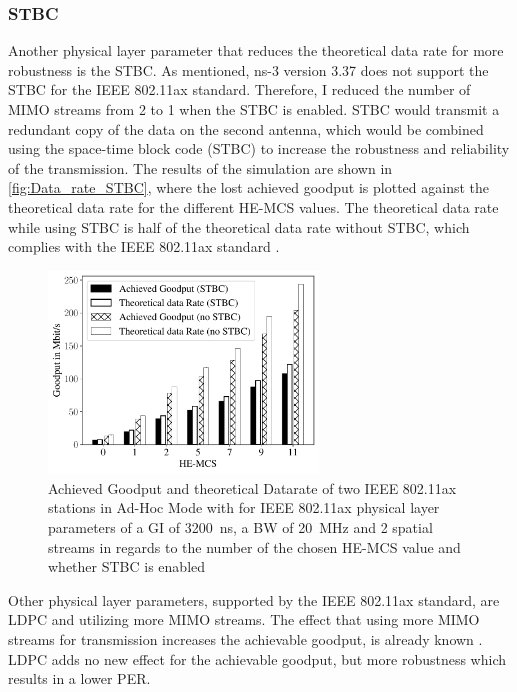 \subsubsection*{\acf{STBC}}
\label{sec:STBCDataRate}
Another physical layer parameter that reduces the theoretical data rate for more robustness is the \ac{STBC}.
As mentioned, ns-3 version 3.37 does not support the \ac{STBC} for the IEEE 802.11ax standard.
Therefore, I reduced the number of
\ac{MIMO} streams from \num{2} to \num{1} when the \ac{STBC} is enabled. \ac{STBC} would transmit a redundant copy of the data on the second antenna, which would be combined
using the space-time block code (STBC) to increase the robustness and reliability of the transmission.
The results of the simulation are shown in \autoref{fig:Data_rate_STBC}, where the lost achieved goodput is plotted against
the theoretical data rate for the different \ac{HE}-\ac{MCS} values.
The theoretical data rate while using \ac{STBC} is half of the theoretical data rate without \ac{STBC},
which complies with the IEEE 802.11ax standard \cite{ieee_standard_2021ax}.
\begin{figure}[H]%
   \centering
   \includegraphics[width=0.64\textwidth]{figures/STBC_dataRate_simulation}
   \caption{Achieved Goodput and theoretical Datarate of two IEEE 802.11ax stations in Ad-Hoc Mode with for IEEE 802.11ax physical layer parameters of a \acf{GI} of \SI{3200}{\nano\second}, a \acf{BW} of \SI{20}{\mega\hertz} and 2 spatial streams  in regards to the number of the chosen \ac{HE}-\acf{MCS} value and whether \acf{STBC} is enabled}%
   \label{fig:Data_rate_STBC}%
\end{figure}

Other physical layer parameters, supported by the IEEE 802.11ax standard, are \ac{LDPC} and utilizing more \ac{MIMO} streams.
The effect that using more \ac{MIMO} streams for transmission increases the achievable goodput, is already known \cite[294-296]{sauter_wireless_2022, ieee_standard_2021ax, ieee_standard_2020}.
\ac{LDPC} adds no new effect for the achievable goodput, but more robustness which results in a lower \ac{PER}.

